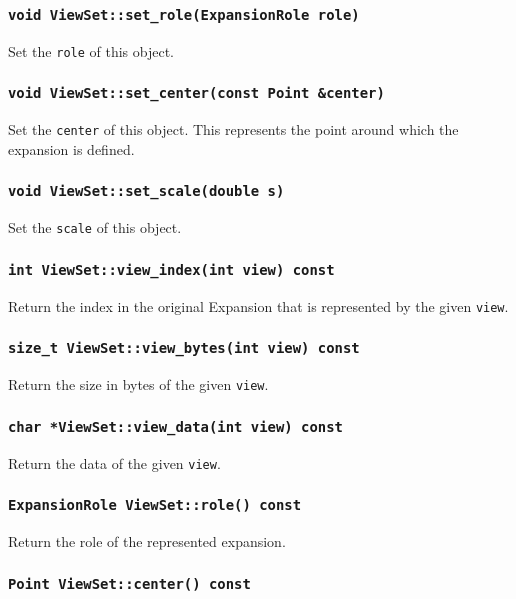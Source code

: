 \subsubsection{\texttt{void ViewSet::set\_role(ExpansionRole role)}}

Set the \texttt{role} of this object.

\subsubsection{\texttt{void ViewSet::set\_center(const Point \&center)}}

Set the \texttt{center} of this object. This represents the point around
which the expansion is defined.

\subsubsection{\texttt{void ViewSet::set\_scale(double s)}}

Set the \texttt{scale} of this object.

\subsubsection{\texttt{int ViewSet::view\_index(int view) const}}

Return the index in the original Expansion that is represented by the
given \texttt{view}.

\subsubsection{\texttt{size\_t ViewSet::view\_bytes(int view) const}}

Return the size in bytes of the given \texttt{view}.

\subsubsection{\texttt{char *ViewSet::view\_data(int view) const}}

Return the data of the given \texttt{view}.

\subsubsection{\texttt{ExpansionRole ViewSet::role() const}}

Return the role of the represented expansion.

\subsubsection{\texttt{Point ViewSet::center() const}}


